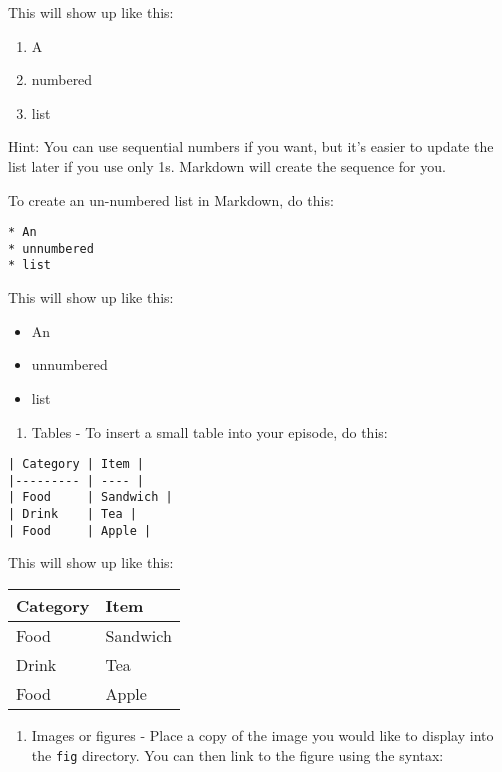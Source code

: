 \documentclass[
]{book}
\providecommand{\tightlist}{%
  \setlength{\itemsep}{0pt}\setlength{\parskip}{0pt}}
\begin{document}
This will show up like this:

\begin{enumerate}
\def\labelenumi{\arabic{enumi}.}
\tightlist
\item
  A
\item
  numbered
\item
  list
\end{enumerate}

Hint: You can use sequential numbers if you want, but it's easier to update the list later if you use only 1s.
Markdown will create the sequence for you.

To create an un-numbered list in Markdown, do this:

\begin{verbatim}
* An
* unnumbered
* list
\end{verbatim}

This will show up like this:

\begin{itemize}
\tightlist
\item
  An
\item
  unnumbered
\item
  list
\end{itemize}

\begin{enumerate}
\def\labelenumi{\arabic{enumi}.}
\tightlist
\item
  Tables - To insert a small table into your episode, do this:
\end{enumerate}

\begin{verbatim}
| Category | Item | 
|--------- | ---- |
| Food     | Sandwich |
| Drink    | Tea | 
| Food     | Apple |
\end{verbatim}

This will show up like this:

\begin{longtable}[]{@{}ll@{}}
\toprule
Category & Item\tabularnewline
\midrule
\endhead
Food & Sandwich\tabularnewline
Drink & Tea\tabularnewline
Food & Apple\tabularnewline
\bottomrule
\end{longtable}

\begin{enumerate}
\def\labelenumi{\arabic{enumi}.}
\tightlist
\item
  Images or figures - Place a copy of the image you would like to display into the \texttt{fig} directory. You can
  then link to the figure using the syntax:
\end{enumerate}
\end{document}
